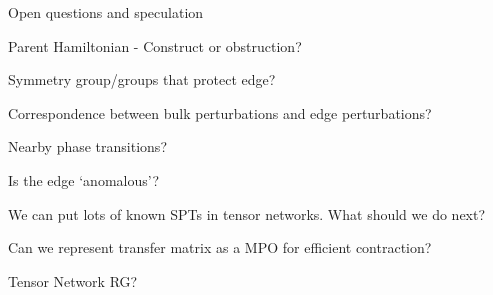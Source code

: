 \begin{frame}{Open questions and speculation}
\bi
\item Parent Hamiltonian - Construct or obstruction?
\item Symmetry group/groups that protect edge?
\item Correspondence between bulk perturbations and edge perturbations?
\item Nearby phase transitions? 
\item Is the edge `anomalous'? 
\item We can put lots of known SPTs in tensor networks. What should we do next?
\item Can we represent transfer matrix as a MPO for efficient contraction?
\item Tensor Network RG?
\ei 

\end{frame}